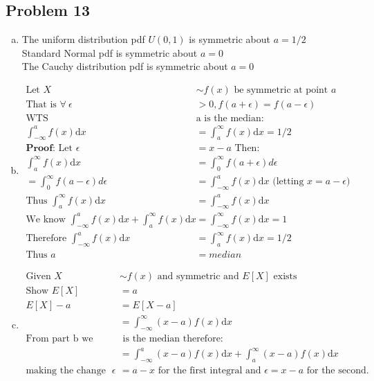 \documentclass{article}
\newcommand{\dx}{\mathrm{d}x}
\begin{document}
\begin{flushleft}
\section*{Problem 13}
\begin{enumerate}[(a)]
\item
The uniform distribution pdf $U(0,1)$ is symmetric about $a=1/2$\\
Standard Normal pdf is symmetric about $a=0$\\
The Cauchy distribution pdf is symmetric about $a=0$
\item
\begin{align*}
\text{Let } X &\sim f(x) \text{ be symmetric at point } a \\
\text{That is } \forall \ \epsilon &>0, f(a+\epsilon)=f(a-\epsilon)\\
\text{WTS } &\text{a is the median:}\\ \int_{-\infty}^{a}f(x)\dx&=\int_{a}^{\infty}f(x)\dx=1/2\\
\textbf{Proof:}\text{ Let } \epsilon&=x-a \text{ Then:}\\
\int_{a}^{\infty}f(x)\dx&=\int_{0}^{\infty}f(a+\epsilon) d\epsilon\\
=\int_{0}^{\infty}f(a-\epsilon)d\epsilon&=\int_{-\infty}^{a}f(x)\dx\text{ (letting } x=a-\epsilon)\\
\text{Thus } \int_{a}^{\infty}f(x)\dx&=\int_{-\infty}^{a}f(x)\dx\\
\text{We know } \int_{-\infty}^{a}f(x)\dx+\int_{a}^{\infty}f(x)\dx&=\int_{-\infty}^{\infty}f(x)\dx=1\\
\text{Therefore } \int_{-\infty}^{a}f(x)\dx&=\int_{a}^{\infty}f(x)\dx=1/2\\
\text{Thus }a&=median
\end{align*}
\item 
\begin{align*}
\text{Given } X&\sim f(x) \text{ and symmetric and } E[X] \text{ exists}\\
\text{Show } E[X]&=a\\
E[X]-a&=E[X-a]\\
&=\int_{-\infty}^{\infty}(x-a)f(x)\dx\\
\text{From part b we know a}&\text{ is the median therefore:}\\
&=\int_{-\infty}^{a}(x-a)f(x)\dx+\int_{a}^{\infty}(x-a)f(x)\dx\\
\text{making the change of variables } \epsilon&=a-x \text{ for the first integral and } \epsilon=x-a \text{ for the second.}\\

\end{align*}
\end{enumerate}
\end{flushleft}
\end{document}
